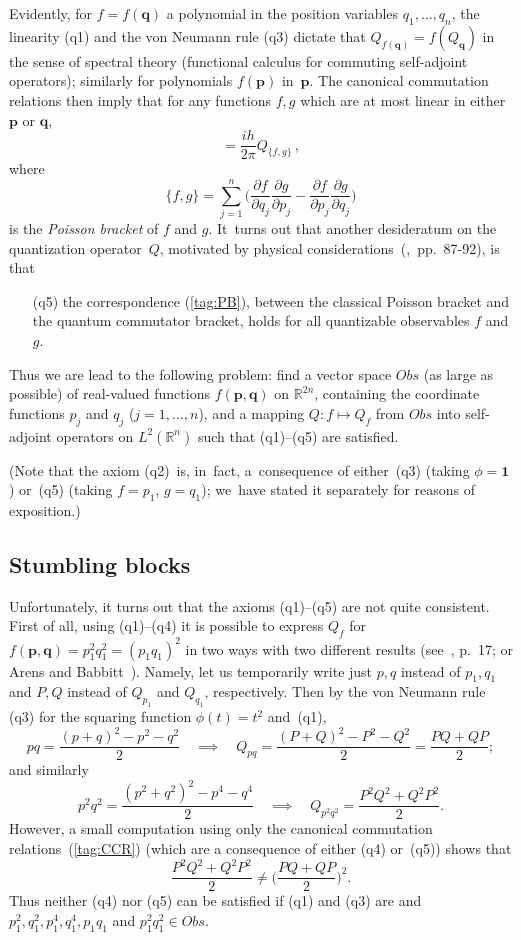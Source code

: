 \documentclass[12pt]{amsart}
\numberwithin{equation}{section}
\theoremstyle{remark}
\let\boldkey\mathbf \let\bold\mathbf
\newcommand\jedna{{\boldkey1}}
\newcommand\Obs{Obs}
\newcommand\RR{\mathbb R}
\newcommand{\bp}{\mathbf p}
\newcommand{\bq}{\mathbf q}
\begin{document}
Evidently, for $f=f(\bq)$ a polynomial in the position variables
$q_1,\dots,q_n$, the linearity (q1) and the von Neumann rule (q3) dictate that
$Q_{f(\bq)}=f(Q_\bq)$ in the sense of spectral theory (functional calculus for
commuting self-adjoint operators); similarly for polynomials $f(\bp)$ in~$\bp$.
The canonical commutation relations then imply that for any functions $f,g$
which are at most linear in either $\bp$ or $\bq$,
\begin{equation}  [Q_f,Q_g] = \frac{ih}{2\pi} Q_{\{f,g\}} \, ,  \label{tag:PB}
\end{equation}
where
\begin{equation}  \{f,g\} = \sum_{j=1}^n \bigg( \frac{\partial f}{\partial q_j}
\frac{\partial g}{\partial p_j} -\frac{\partial f}{\partial p_j}
\frac{\partial g}{\partial q_j} \bigg)   \label{tag:POAB}   \end{equation}
is the {\it Poisson bracket\/} of $f$ and $g$. It~turns out that another
desideratum on the quantization operator~$Q$, motivated by physical
considerations~(\cite{bib:Dirac},~pp.~87-92), is that
\begin{enumerate}
\item[(q5)] the correspondence (\ref{tag:PB}), between the classical Poisson
bracket and the quantum commutator bracket,  holds for all quantizable
observables $f$ and $g$.
\end{enumerate}
Thus we are lead to the following problem: find a vector space $\Obs$ (as large
as possible) of real-valued functions $f(\bp,\bq)$ on $\RR^{2n}$, containing
the coordinate functions $p_j$ and $q_j$ ($j=1,\dots,n$), and a mapping
$Q:f\mapsto Q_f$ from $\Obs$ into self-adjoint operators on $L^2(\RR^n)$ such
that (q1)--(q5) are satisfied.

(Note that the axiom (q2)~is, in~fact, a~consequence of either~(q3) (taking
$\phi=\jedna$) or~(q5) (taking $f=p_1$, $g=q_1$); we~have stated it separately
for reasons of exposition.)

\subsection{Stumbling blocks}

Unfortunately, it turns out that the axioms (q1)--(q5) are not quite
consistent. First of all, using (q1)--(q4) it is possible to express $Q_f$ for
$f(\bp,\bq)=p_1^2 q_1^2=(p_1 q_1)^2$ in two ways with two different results
(see~\cite{bib:Foll}, p.~17; or Arens and Babbitt~\cite{bib:ArensB}). Namely,
let us temporarily write just $p,q$ instead of $p_1,q_1$ and $P,Q$ instead of
$Q_{p_1}$ and $Q_{q_1}$, respectively. Then by the von Neumann rule (q3) for
the squaring function $\phi(t)=t^2$ and~(q1),
$$ pq = \frac{(p+q)^2-p^2-q^2}2 \quad \implies \quad
Q_{pq} = \frac{(P+Q)^2-P^2-Q^2}2=\frac{PQ+QP}2;  $$
and similarly
$$ p^2 q^2 = \frac{(p^2+q^2)^2-p^4-q^4}2 \quad \implies \quad
Q_{p^2 q^2} = \frac{P^2 Q^2+Q^2 P^2}2 .  $$
However, a small computation using only the canonical commutation
relations~(\ref{tag:CCR}) (which are a consequence of either (q4) or~(q5))
shows that
$$ \frac{P^2 Q^2+Q^2 P^2}2 \neq \bigg(\frac{PQ+QP}2\bigg)^2.   $$
Thus neither (q4) nor (q5) can be satisfied if (q1) and (q3) are and $p_1^2,
q_1^2,p_1^4,q_1^4,p_1 q_1$ and $p_1^2 q_1^2\in\Obs$.
\end{document}

